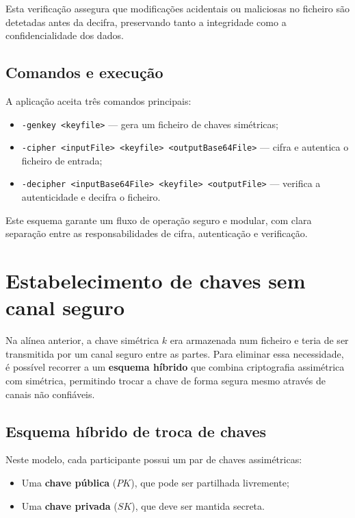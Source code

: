 Esta verificação assegura que modificações acidentais ou maliciosas no ficheiro são detetadas antes da decifra, preservando tanto a integridade como a confidencialidade dos dados.


\subsection{Comandos e execução}

A aplicação aceita três comandos principais:
\begin{itemize}
    \item \texttt{-genkey <keyfile>} — gera um ficheiro de chaves simétricas;
    \item \texttt{-cipher <inputFile> <keyfile> <outputBase64File>} — cifra e autentica o ficheiro de entrada;
    \item \texttt{-decipher <inputBase64File> <keyfile> <outputFile>} — verifica a autenticidade e decifra o ficheiro.
\end{itemize}

Este esquema garante um fluxo de operação seguro e modular, com clara separação entre as responsabilidades de cifra, autenticação e verificação.

\section{Estabelecimento de chaves sem canal seguro}

Na alínea anterior, a chave simétrica \(k\) era armazenada num ficheiro e teria de ser transmitida por um canal seguro entre as partes. Para eliminar essa necessidade, é possível recorrer a um \textbf{esquema híbrido} que combina criptografia assimétrica com simétrica, permitindo trocar a chave de forma segura mesmo através de canais não confiáveis.

\subsection{Esquema híbrido de troca de chaves}

Neste modelo, cada participante possui um par de chaves assimétricas:
\begin{itemize}
    \item Uma \textbf{chave pública} (\(PK\)), que pode ser partilhada livremente;
    \item Uma \textbf{chave privada} (\(SK\)), que deve ser mantida secreta.
\end{itemize}

